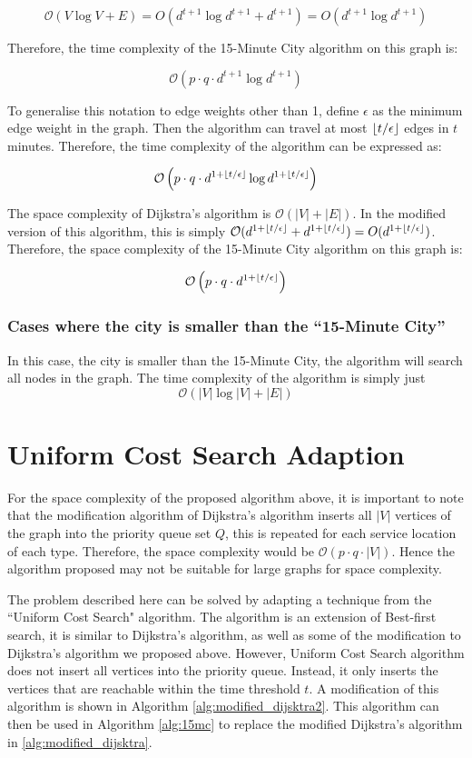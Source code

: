 $$\mathcal{O}(V\log V+E)=O(d^{t+1}\log d^{t+1}+d^{t+1})=O(d^{t+1}\log d^{t+1})$$

Therefore, the time complexity of the 15-Minute City algorithm on this graph is:

$$\mathcal{O}\left(p\cdot q\cdot d^{t+1}\log d^{t+1}\right)$$

To generalise this notation to edge weights other than 1, define $\epsilon$ as the minimum edge weight in the graph. Then the algorithm can travel at most $\floor*{t/\epsilon}$ edges in $t$ minutes. Therefore, the time complexity of the algorithm can be expressed as:

$$\mathcal{O}\left(p\cdot q\cdot d^{1+\floor*{t/\epsilon}}\log d^{1+\floor*{t/\epsilon}}\right)$$

The space complexity of Dijkstra's algorithm is $\mathcal{O}(|V|+|E|)$. In the modified version of this algorithm, this is simply $\mathcal{O}(d^{1+\floor*{t/\epsilon}}+d^{1+\floor*{t/\epsilon}}) = O(d^{1+\floor*{t/\epsilon}})$. Therefore, the space complexity of the 15-Minute City algorithm on this graph is:

$$\mathcal{O}\left(p\cdot q\cdot d^{1+\floor*{t/\epsilon}}\right)$$

\subsubsection{Cases where the city is smaller than the ``15-Minute City''}

In this case, the city is smaller than the 15-Minute City, the algorithm will search all nodes in the graph. The time complexity of the algorithm is simply just $$\mathcal{O}(|V|\log |V|+|E|)$$

\section{Uniform Cost Search Adaption}

For the space complexity of the proposed algorithm above, it is important to note that the modification algorithm of Dijkstra's algorithm inserts all $|V|$ vertices of the graph into the priority queue set $Q$, this is repeated for each service location of each type. Therefore, the space complexity would be $\mathcal{O}(p\cdot q\cdot |V|)$. Hence the algorithm proposed may not be suitable for large graphs for space complexity.

The problem described here can be solved by adapting a technique from the ``Uniform Cost Search" algorithm. The algorithm is an extension of Best-first search, it is similar to Dijkstra's algorithm, as well as some of the modification to Dijkstra's algorithm we proposed above. However, Uniform Cost Search algorithm does not insert all vertices into the priority queue. Instead, it only inserts the vertices that are reachable within the time threshold $t$. A modification of this algorithm is shown in Algorithm \ref{alg:modified_dijsktra2}. This algorithm can then be used in Algorithm \ref{alg:15mc} to replace the modified Dijkstra's algorithm in \ref{alg:modified_dijsktra}.

